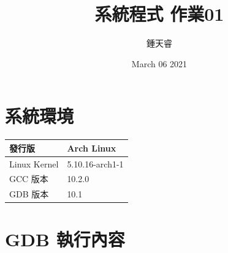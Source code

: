 \documentclass{ctexart}
\begin{document}
\pagestyle{headings}
\title{系統程式 作業01}
\author{鍾天睿}
\date{March 06 2021}

\maketitle
\section{系統環境}
\begin{center}
\begin{tabular}{ |l|l| } 
\hline
發行版 & Arch Linux  \\
\hline
Linux Kernel & 5.10.16-arch1-1  \\
\hline
GCC 版本 & 10.2.0 \\
\hline
GDB 版本 & 10.1 \\
\hline
\end{tabular}
\end{center}
\clearpage
\section{GDB 執行內容}
\end{document}
